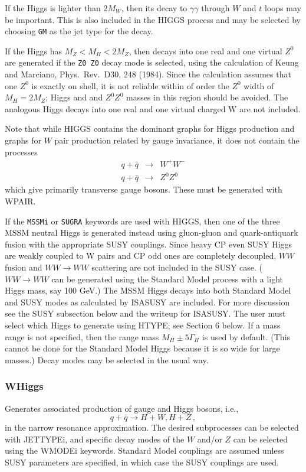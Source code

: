       If the Higgs is lighter than $2M_W$, then its decay to
$\gamma\gamma$ through $W$ and $t$ loops may be important. This is
also included in the HIGGS process and may be selected by choosing
\verb|GM| as the jet type for the decay.

      If the Higgs has $M_Z < M_H < 2M_Z$, then decays into one real
and one virtual $Z^0$ are generated if the \verb|Z0 Z0| decay mode is
selected, using the calculation of Keung and Marciano, Phys.\ Rev.\
D30, 248 (1984). Since the calculation assumes that one $Z^0$ is
exactly on shell, it is not reliable within of order the $Z^0$ width
of $M_H = 2M_Z$; Higgs and and $Z^0 Z^0$ masses in this region should
be avoided. The analogous Higgs decays into one real and one virtual
charged W are not included.

      Note that while HIGGS contains the dominant graphs for Higgs
production and graphs for $W$ pair production related by gauge invariance,
it does not contain the processes
\begin{eqnarray*}
q + \bar q &\to& W^+ W^- \\
q + \bar q &\to& Z^0 Z^0
\end{eqnarray*}
which give primarily transverse gauge bosons. These must be generated
with WPAIR.

      If the \verb|MSSMi| or \verb|SUGRA| keywords are used with
HIGGS, then one of the three MSSM neutral Higgs is generated instead
using gluon-gluon and quark-antiquark fusion with the appropriate SUSY
couplings. Since heavy CP even SUSY Higgs are weakly coupled to W
pairs and CP odd ones are completely decoupled, $WW$ fusion and $WW
\to WW$ scattering are not included in the SUSY case. ($WW \to WW$ can
be generated using the Standard Model process with a light Higgs mass,
say 100 GeV.) The MSSM Higgs decays into both Standard Model and SUSY
modes as calculated by ISASUSY are included. For more discussion see
the SUSY subsection below and the writeup for ISASUSY. The user must
select which Higgs to generate using HTYPE; see Section 6 below. If a
mass range is not specified, then the range mass $M_H \pm 5\Gamma_H$
is used by default. (This cannot be done for the Standard Model Higgs
because it is so wide for large masses.) Decay modes may be selected
in the usual way.

\subsubsection{WHiggs} Generates associated production of gauge and
Higgs bosons, i.e.,
$$
q + \bar q \to H + W, H + Z\,,
$$
in the narrow resonance approximation. The desired subprocesses can be
selected with JETTYPEi, and specific decay modes of the $W$ and/or $Z$
can be selected using the WMODEi keywords. Standard Model couplings are
assumed unless SUSY parameters are specified, in which case the SUSY
couplings are used.

